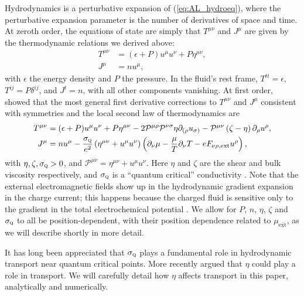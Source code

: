 Hydrodynamics is a perturbative expansion of (\ref{eq:AL_hydroeq}), where the perturbative expansion parameter is the number of derivatives of space and time.   At zeroth order, the equations of state are simply that $T^{\mu\nu}$ and $J^\mu$ are given by the  thermodynamic  relations we derived above:  \begin{subequations}\begin{align}
T^{\mu\nu} &=  (\epsilon + P)u^\mu u^\nu + P \eta^{\mu\nu}, \\
J^\mu &=  n u^\mu,
\end{align}\end{subequations} with $\epsilon$ the energy density and $P$ the pressure.   In the fluid's rest frame,  $T^{tt}=\epsilon$, $T^{ij} = P\delta^{ij}$, and $J^t=n$, with all other components vanishing.  At first order, \cite{hartnoll_theory_2007} showed that the most general first derivative corrections to $T^{\mu\nu}$ and $J^\mu$ consistent with symmetries and the local second law of thermodynamics are \begin{subequations}\begin{align}
T^{\mu\nu} &= (\epsilon +P )u^\mu u^\nu + P\eta^{\mu\nu}-2\mathcal{P}^{\mu\rho}\mathcal{P}^{\nu\sigma}\eta \partial_{(\rho} u_{\sigma)} - \mathcal{P}^{\mu\nu}\left(\zeta-\eta\right)\partial_\rho u^\rho   , \\
J^\mu &=  n u^\mu - \frac{\sigma_{\textsc{q}}}{e^2} \left(\eta^{\mu\nu}+u^\mu u^\nu\right)\left(\partial_\nu \mu - \frac{\mu}{T}\partial_\nu T - eF_{\nu\rho,\text{ext}}u^\rho\right),
\end{align}\end{subequations}
with $\eta,\zeta,\sigma_{\textsc{q}} >0$, and $\mathcal{P}^{\mu\nu} = \eta^{\mu\nu} + u^\mu u^\nu$.    Here $\eta$ and $\zeta$ are the shear and bulk viscosity respectively, and $\sigma_{\textsc{q}}$ is a ``quantum critical'' conductivity \cite{hartnoll_theory_2007}.
  Note that the external electromagnetic fields show up in the hydrodynamic gradient expansion in the charge current;  this happens because the charged fluid is sensitive only to the gradient in the total electrochemical potential \cite{pines}.  We allow for $P$, $n$, $\eta$, $\zeta$ and $\sigma_{\textsc{q}}$ to all be position-dependent, with their position dependence related to $\mu_{\mathrm{ext}}$, as we will describe shortly in more detail.   

It has long been appreciated \cite{hartnoll_theory_2007} that $\sigma_{\textsc{q}}$ plays a fundamental role in hydrodynamic transport near quantum critical points.   More recently \cite{dsz} argued that $\eta$ could play a role in transport.   We will carefully detail how $\eta$ affects transport in this paper, analytically and numerically.

